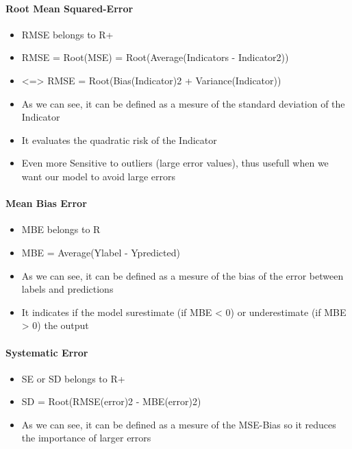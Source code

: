 \documentclass[11pt]{article}
\providecommand{\tightlist}{%
      \setlength{\itemsep}{0pt}\setlength{\parskip}{0pt}}
\begin{document}
    \hypertarget{root-mean-squared-error}{%
\paragraph{Root Mean Squared-Error}\label{root-mean-squared-error}}

\begin{itemize}
\tightlist
\item
  RMSE belongs to R+
\item
  RMSE = Root(MSE) = Root(Average(Indicators - Indicator2))
\item
  \textless=\textgreater{} RMSE = Root(Bias(Indicator)2 +
  Variance(Indicator))
\item
  As we can see, it can be defined as a mesure of the standard deviation
  of the Indicator
\item
  It evaluates the quadratic risk of the Indicator
\item
  Even more Sensitive to outliers (large error values), thus usefull
  when we want our model to avoid large errors
\end{itemize}

    \hypertarget{mean-bias-error}{%
\paragraph{Mean Bias Error}\label{mean-bias-error}}

\begin{itemize}
\tightlist
\item
  MBE belongs to R
\item
  MBE = Average(Ylabel - Ypredicted)
\item
  As we can see, it can be defined as a mesure of the bias of the error
  between labels and predictions
\item
  It indicates if the model surestimate (if MBE \textless{} 0) or
  underestimate (if MBE \textgreater{} 0) the output
\end{itemize}

    \hypertarget{systematic-error}{%
\paragraph{Systematic Error}\label{systematic-error}}

\begin{itemize}
\tightlist
\item
  SE or SD belongs to R+
\item
  SD = Root(RMSE(error)2 - MBE(error)2)
\item
  As we can see, it can be defined as a mesure of the MSE-Bias so it
  reduces the importance of larger errors
\end{itemize}
\end{document}
